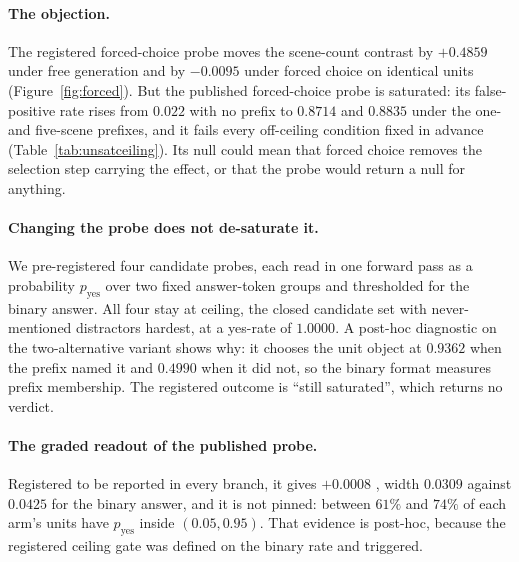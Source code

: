 \paragraph{The objection.} The registered forced-choice probe moves the scene-count contrast by
$+0.4859$ under free generation and by $-0.0095$  under forced choice on
identical units (Figure~\ref{fig:forced}). But the published forced-choice probe is saturated: its
false-positive rate rises from $0.022$ with no prefix to $0.8714$ and $0.8835$ under the one- and
five-scene prefixes, and it fails every off-ceiling condition fixed in advance
(Table~\ref{tab:unsatceiling}). Its null could mean that forced choice removes the selection step
carrying the effect, or that the probe would return a null for anything.

\paragraph{Changing the probe does not de-saturate it.}\label{app:unsat-gate} We pre-registered four
candidate probes, each read in one forward pass as a probability $p_{\mathrm{yes}}$ over two fixed
answer-token groups and thresholded for the binary answer. All four stay at ceiling, the closed
candidate set with never-mentioned distractors hardest, at a yes-rate of $1.0000$. A post-hoc
diagnostic on the two-alternative variant shows why: it chooses the unit object at $0.9362$ when the
prefix named it and $0.4990$ when it did not, so the binary format measures prefix membership. The
registered outcome is ``still saturated'', which returns no verdict.

\paragraph{The graded readout of the published probe.} Registered to be reported in every branch, it
gives $+0.0008$ , width $0.0309$ against $0.0425$ for the binary answer, and
it is not pinned: between $61\%$ and $74\%$ of each arm's units have $p_{\mathrm{yes}}$ inside
$(0.05, 0.95)$. That evidence is post-hoc, because the registered ceiling gate was defined on the
binary rate and triggered.

